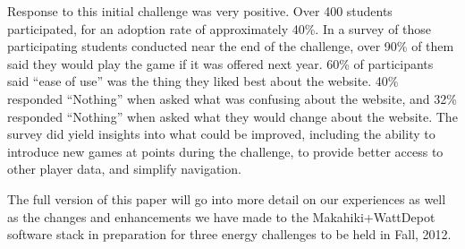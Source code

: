 \documentclass{acm_proc_article-sp}
\begin{document}
Response to this initial challenge was very positive.   Over 400 students participated,
for an adoption rate of approximately 40\%.  In a survey of those participating students
conducted near the end of the challenge, over 90\% of them said they would play the game
if it was offered next year.  60\% of participants said ``ease of use'' was the thing they
liked best about the website.  40\% responded ``Nothing'' when asked what was
confusing about the website, and 32\% responded ``Nothing'' when asked what they would
change about the website.  The survey did yield insights into what could be improved,
including the ability to introduce new games at points during the challenge, to provide
better access to other player data, and simplify navigation. 

The full version of this paper will go into more detail on our experiences as well as the
changes and enhancements we have made to the Makahiki+WattDepot software stack in
preparation for three energy challenges to be held in Fall, 2012.



\end{document}
